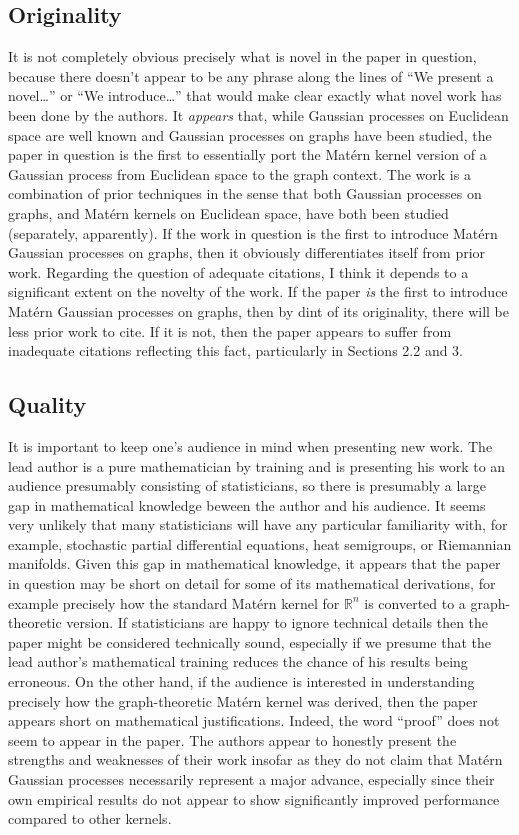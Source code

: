 \subsection{Originality}

It is not completely obvious precisely what is novel in the paper in question, because there doesn't appear to be any phrase along the lines of ``We present a novel\dots'' or ``We introduce\dots'' that would make clear exactly what novel work has been done by the authors. It \textit{appears} that, while Gaussian processes on Euclidean space are well known and Gaussian processes on graphs have been studied, the paper in question is the first to essentially port the Mat\'{e}rn kernel version of a Gaussian process from Euclidean space to the graph context. The work is a combination of prior techniques in the sense that both Gaussian processes on graphs, and Mat\'{e}rn kernels on Euclidean space, have both been studied (separately, apparently). If the work in question is the first to introduce Mat\'{e}rn Gaussian processes on graphs, then it obviously differentiates itself from prior work. Regarding the question of adequate citations, I think it depends to a significant extent on the novelty of the work. If the paper \textit{is} the first to introduce Mat\'{e}rn Gaussian processes on graphs, then by dint of its originality, there will be less prior work to cite. If it is not, then the paper appears to suffer from inadequate citations reflecting this fact, particularly in Sections 2.2 and 3.

\subsection{Quality}

It is important to keep one's audience in mind when presenting new work. The lead author is a pure mathematician by training and is presenting his work to an audience presumably consisting of statisticians, so there is presumably a large gap in mathematical knowledge beween the author and his audience. It seems very unlikely that many statisticians will have any particular familiarity with, for example, stochastic partial differential equations, heat semigroups, or Riemannian manifolds. Given this gap in mathematical knowledge, it appears that the paper in question may be short on detail for some of its mathematical derivations, for example precisely how the standard Mat\'{e}rn kernel for $\mathbb R^n$ is converted to a graph-theoretic version. If statisticians are happy to ignore technical details then the paper might be considered technically sound, especially if we presume that the lead author's mathematical training reduces the chance of his results being erroneous. On the other hand, if the audience is interested in understanding precisely how the graph-theoretic Mat\'{e}rn kernel was derived, then the paper appears short on mathematical justifications. Indeed, the word ``proof'' does not seem to appear in the paper. The authors appear to honestly present the strengths and weaknesses of their work insofar as they do not claim that Mat\'{e}rn Gaussian processes necessarily represent a major advance, especially since their own empirical results do not appear to show significantly improved performance compared to other kernels.

